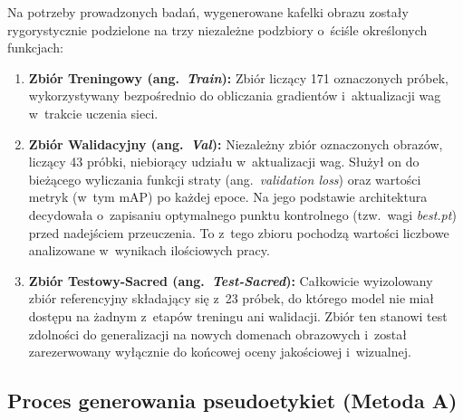 Na potrzeby prowadzonych badań, wygenerowane kafelki obrazu zostały rygorystycznie podzielone na trzy niezależne podzbiory o~ściśle określonych funkcjach:
\begin{enumerate}
    \item \textbf{Zbiór Treningowy (ang.\ \emph{Train}):} Zbiór liczący 171 oznaczonych próbek, wykorzystywany bezpośrednio do obliczania gradientów i~aktualizacji wag w~trakcie uczenia sieci.
    \item \textbf{Zbiór Walidacyjny (ang.\ \emph{Val}):} Niezależny zbiór oznaczonych obrazów, liczący 43 próbki, niebiorący udziału w~aktualizacji wag. Służył on do bieżącego wyliczania funkcji straty (ang.\ \emph{validation loss}) oraz wartości metryk (w~tym mAP) po każdej epoce. Na jego podstawie architektura decydowała o~zapisaniu optymalnego punktu kontrolnego (tzw.\ wagi \emph{best.pt}) przed nadejściem przeuczenia. To z~tego zbioru pochodzą wartości liczbowe analizowane w~wynikach ilościowych pracy.
    \item \textbf{Zbiór Testowy-Sacred (ang.\ \emph{Test-Sacred}):} Całkowicie wyizolowany zbiór referencyjny składający się z~23 próbek, do którego model nie miał dostępu na żadnym z~etapów treningu ani walidacji. Zbiór ten stanowi test zdolności do generalizacji na nowych domenach obrazowych i~został zarezerwowany wyłącznie do końcowej oceny jakościowej i~wizualnej.
\end{enumerate}

\subsection{Proces generowania pseudoetykiet (Metoda A)}

